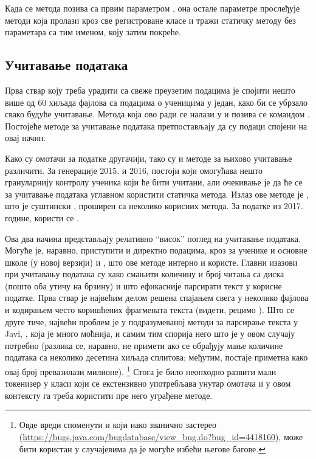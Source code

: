 Када се  метода позива са првим параметром , она остале параметре прослеђује  методи која пролази кроз све регистроване класе и тражи статичку методу без параметара са тим именом, коју затим покреће.

\subsection{Учитавање података}

Прва ствар коју треба урадити са свеже преузетим подацима је спојити нешто више од 60 хиљада фајлова са подацима о ученицима у један, како би се убрзало свако будуће учитавање. Метода која ово ради се налази у  и позива се командом . Постојеће методе за учитавање података претпостављају да су подаци спојени на овај начин.

Како су омотачи за податке другачији, тако су и методе за њихово учитавање различити. За генерације 2015. и 2016, постоји  који омогућава нешто грануларнију контролу ученика који ће бити учитани, али очекивање је да ће се за учитавање података углавном користити  статичка метода. Излаз ове методе је , што је суштински , проширен са неколико корисних метода. За податке из 2017. године, користи се .

Ова два начина представљају релативно \enquote{висок} поглед на учитавање података. Могуће је, наравно, приступити и директно подацима, кроз  за ученике и основне школе (у новој верзији) и , што ове методе интерно и користе. Главни изазови при учитавању података су како смањити количину и број читања са диска (пошто оба утичу на брзину) и што ефикасније парсирати текст у корисне податке. Прва ствар је највећим делом решена спајањем свега у неколико фајлова и кодирањем често коришћених фрагмената текста (видети, рецимо ). Што се друге тиче, највећи проблем је у подразумеваној методи за парсирање текста у Javi, , која је много моћнија, и самим тим спорија него што је у овом случају потребно (разлика се, наравно, не примети ако се обрађују мање количине података са неколико десетина хиљада сплитова; међутим, постаје приметна како овај број превазилази милионе). \footnote{Овде вреди споменути и  који иако званично застерео (\url{https://bugs.java.com/bugdatabase/view_bug.do?bug_id=4418160}), може бити користан у случајевима да је могуће избећи његове багове.} Стога је било неопходно развити мали токенизер у класи  који се екстензивно употребљава унутар омотача и у овом контексту га треба користити пре него уграђене методе.

